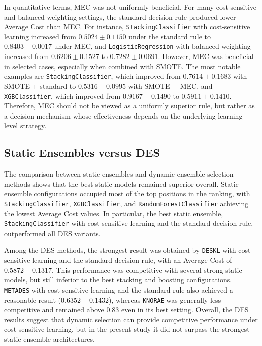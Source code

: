 \documentclass[conference]{IEEEtran}
\begin{document}
In quantitative terms, MEC was not uniformly beneficial. For many cost-sensitive and balanced-weighting settings, the standard decision rule produced lower Average Cost than MEC. For instance, \texttt{StackingClassifier} with cost-sensitive learning increased from \(0.5024 \pm 0.1150\) under the standard rule to \(0.8403 \pm 0.0017\) under MEC, and \texttt{LogisticRegression} with balanced weighting increased from \(0.6206 \pm 0.1527\) to \(0.7282 \pm 0.0691\). However, MEC was beneficial in selected cases, especially when combined with SMOTE. The most notable examples are \texttt{StackingClassifier}, which improved from \(0.7614 \pm 0.1683\) with SMOTE + standard to \(0.5316 \pm 0.0995\) with SMOTE + MEC, and \texttt{XGBClassifier}, which improved from \(0.9167 \pm 0.1490\) to \(0.5911 \pm 0.1410\). Therefore, MEC should not be viewed as a uniformly superior rule, but rather as a decision mechanism whose effectiveness depends on the underlying learning-level strategy.

\subsection{Static Ensembles versus DES}

The comparison between static ensembles and dynamic ensemble selection methods shows that the best static models remained superior overall. Static ensemble configurations occupied most of the top positions in the ranking, with \texttt{StackingClassifier}, \texttt{XGBClassifier}, and \texttt{RandomForestClassifier} achieving the lowest Average Cost values. In particular, the best static ensemble, \texttt{StackingClassifier} with cost-sensitive learning and the standard decision rule, outperformed all DES variants.

Among the DES methods, the strongest result was obtained by \texttt{DESKL} with cost-sensitive learning and the standard decision rule, with an Average Cost of \(0.5872 \pm 0.1317\). This performance was competitive with several strong static models, but still inferior to the best stacking and boosting configurations. \texttt{METADES} with cost-sensitive learning and the standard rule also achieved a reasonable result (\(0.6352 \pm 0.1432\)), whereas \texttt{KNORAE} was generally less competitive and remained above \(0.83\) even in its best setting. Overall, the DES results suggest that dynamic selection can provide competitive performance under cost-sensitive learning, but in the present study it did not surpass the strongest static ensemble architectures.
\end{document}
